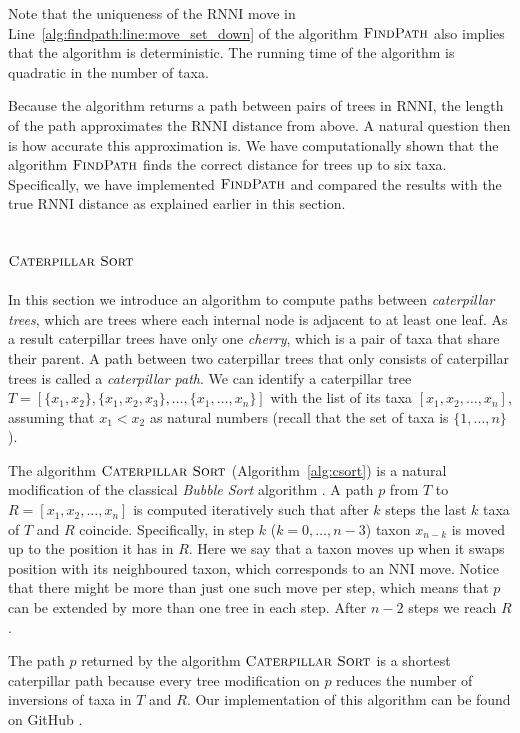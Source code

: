 \documentclass{amsart}
\newcommand{\nni}{\mathrm{NNI}}
\newcommand{\rnni}{\mathrm{RNNI}}
\newcommand{\csort}{\textsc{Caterpillar Sort}}
\newcommand{\findpath}{\textsc{FindPath}}
\begin{document}
Note that the uniqueness of the $\rnni$ move in Line~\ref{alg:findpath:line:move_set_down} of the algorithm $\findpath$ also implies that the algorithm is deterministic.
The running time of the algorithm is quadratic in the number of taxa.

Because the algorithm returns a path between pairs of trees in $\rnni$, the length of the path approximates the $\rnni$ distance from above.
A natural question then is how accurate this approximation is.
We have computationally shown that the algorithm $\findpath$ finds the correct distance for trees up to six taxa.
Specifically, we have implemented $\findpath$ \autocite{Collienne2019} and compared the results with the true $\rnni$ distance as explained earlier in this section.


\subsection{$\csort$}
\label{section:alg_csort}

In this section we introduce an algorithm to compute paths between \emph{caterpillar trees}, which are trees where each internal node is adjacent to at least one leaf.
As a result caterpillar trees have only one \emph{cherry}, which is a pair of taxa that share their parent.
A path between two caterpillar trees that only consists of caterpillar trees is called a \emph{caterpillar path}.
We can identify a caterpillar tree $T = [\{x_1, x_2\}, \{x_1, x_2, x_3\}, \ldots, \{x_1, \ldots, x_n\}]$ with the list of its taxa $[x_1, x_2, \ldots, x_n]$, assuming that $x_1 < x_2$ as natural numbers (recall that the set of taxa is $\{1, \ldots, n\}$).

The algorithm $\csort$ (Algorithm~\ref{alg:csort}) is a natural modification of the classical \emph{Bubble Sort} algorithm \autocite{Knuth1997-pi}.
A path $p$ from $T$ to $R= [x_1, x_2, \ldots, x_n]$ is computed iteratively such that after $k$ steps the last $k$ taxa of $T$ and $R$ coincide.
Specifically, in step $k$ ($k = 0, \ldots, n-3$) taxon $x_{n-k}$ is moved up to the position it has in $R$.
Here we say that a taxon moves up when it swaps position with its neighboured taxon, which corresponds to an $\nni$ move.
Notice that there might be more than just one such move per step, which means that $p$ can be extended by more than one tree in each step.
After $n-2$ steps we reach $R$.

The path $p$ returned by the algorithm $\csort$ is a shortest caterpillar path because every tree modification on $p$ reduces the number of inversions of taxa in $T$ and $R$.
Our implementation of this algorithm can be found on GitHub \autocite{Collienne2019}.
\end{document}
